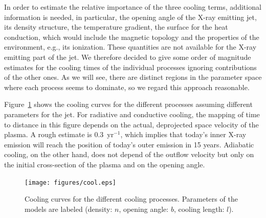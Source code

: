 In order to estimate the relative importance of the three cooling terms, additional information is needed, in particular, the opening angle of the X-ray emitting jet, its density structure, the temperature gradient, the surface for the heat conduction, which would include the magnetic topology and the properties of the environment, e.g., its ionization. These quantities are not available for the X-ray emitting part of the jet. We therefore decided to give some order of magnitude estimates for the cooling times of the individual processes ignoring contributions of the other ones. As we will see, there are distinct regions in the parameter space where each process seems to dominate, so we regard this approach reasonable.

Figure~\ref{fig:cooling} shows the cooling curves for the different processes assuming different parameters for the jet. For radiative and conductive cooling, the mapping of time to distance in this figure depends on the actual, deprojected space velocity of the plasma. 
A rough estimate is 0.3\arcsec{}~yr$^{-1}$, which implies that today's inner X-ray emission will reach the position of today's outer emission in 15 years.
Adiabatic cooling, on the other hand, does not depend of the outflow velocity but only on the initial cross-section of the plasma and on the opening angle.


\begin{figure}
  \centering
   \texttt{[image: figures/cool.eps]}
   \caption{Cooling curves for the different cooling processes. Parameters of the models are labeled (density: $n$, opening angle: $b$, cooling length: $l$). \label{fig:cooling}}
\end{figure}


